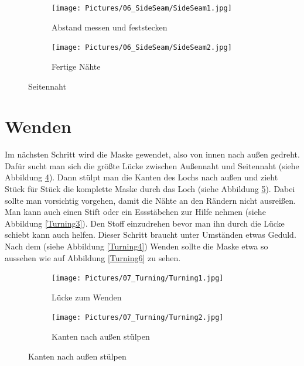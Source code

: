\documentclass[12pt,parskip=full]{scrartcl}
\begin{document}
\begin{figure}[ht]
    \vspace{0.5cm}
    \centering
    \begin{subfigure}{0.48\textwidth}
        \centering
        \texttt{[image: Pictures/06\_SideSeam/SideSeam1.jpg]}
        \caption{Abstand messen und feststecken}
        \label{SideSeam1}
    \end{subfigure}
    \begin{subfigure}{0.48\textwidth}
        \centering
        \texttt{[image: Pictures/06\_SideSeam/SideSeam2.jpg]}
        \caption{Fertige Nähte}
        \label{SideSeam2}
    \end{subfigure}
    \caption{Seitennaht}
    \label{SideSeam}
\end{figure}

\section{Wenden}
Im nächsten Schritt wird die Maske gewendet, also von innen nach außen gedreht. Dafür sucht man sich die größte Lücke zwischen Außennaht und Seitennaht (siehe Abbildung \ref{Turning1}). Dann stülpt man die Kanten des Lochs nach außen und zieht Stück für Stück die komplette Maske durch das Loch (siehe Abbildung \ref{Turning2}). Dabei sollte man vorsichtig vorgehen, damit die Nähte an den Rändern nicht ausreißen. Man kann auch einen Stift oder ein Essstäbchen zur Hilfe nehmen (siehe Abbildung \ref{Turning3}). Den Stoff einzudrehen bevor man ihn durch die Lücke schiebt kann auch helfen. Dieser Schritt braucht unter Umständen etwas Geduld. Nach dem (siehe Abbildung \ref{Turning4}) Wenden sollte die Maske etwa so aussehen wie auf Abbildung \ref{Turning6} zu sehen.

\begin{figure}[hb]
    \vspace{0.5cm}
    \centering
    \begin{subfigure}{0.48\textwidth}
        \centering
        \texttt{[image: Pictures/07\_Turning/Turning1.jpg]}
        \caption{Lücke zum Wenden}
        \label{Turning1}
    \end{subfigure}
    \begin{subfigure}{0.48\textwidth}
        \centering
        \texttt{[image: Pictures/07\_Turning/Turning2.jpg]}
        \caption{Kanten nach außen stülpen}
        \label{Turning2}
    \end{subfigure}
    \label{TurningFirst}
\end{figure}
    
\end{document}
